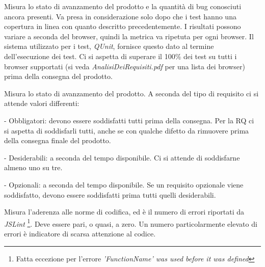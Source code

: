 Misura lo stato di avanzamento del prodotto e la quantit\`a di bug conosciuti ancora presenti. Va presa in considerazione solo dopo che i test hanno una copertura in linea con quanto descritto precedentemente. I risultati possono variare a seconda del browser, quindi la metrica va ripetuta per ogni browser. Il sistema utilizzato per i test, \textit{QUnit}, fornisce questo dato al termine dell'esecuzione dei test. Ci si aspetta di superare il 100\% dei test su tutti i browser supportati (si veda \textit{AnalisiDeiRequisiti.pdf} per una lista dei browser) prima della consegna del prodotto.

Misura lo stato di avanzamento del prodotto. A seconda del tipo di requisito ci si attende valori differenti:
\begin{elencopuntato}[\subsecindent]
\item[-] Obbligatori: devono essere soddisfatti tutti prima della consegna. Per la RQ ci si aspetta di soddisfarli tutti, anche se con qualche difetto da rimuovere prima della consegna finale del prodotto.
\item[-] Desiderabili: a seconda del tempo disponibile. Ci si attende di soddisfarne almeno uno su tre.
\item[-] Opzionali: a seconda del tempo disponibile. Se un requisito opzionale viene soddisfatto, devono essere soddisfatti prima tutti quelli desiderabili.
\end{elencopuntato}

Misura l'aderenza alle norme di codifica, ed \`e il numero di errori riportati da \textit{JSLint} \footnote{Fatta eccezione per l'errore \textit{'FunctionName' was used before it was defined}}. Deve essere pari, o quasi, a zero. Un numero particolarmente elevato di errori \`e indicatore di scarsa attenzione al codice.

 

